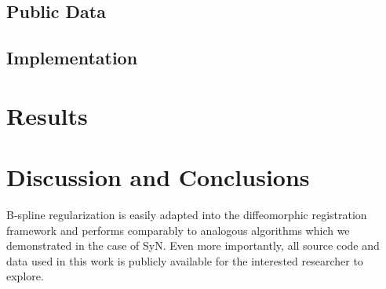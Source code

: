 \documentclass{frontiersSCNS}
\begin{document}
\subsection{Public Data}

\subsection{Implementation}

\section{Results}


\section{Discussion and Conclusions}

B-spline regularization is easily adapted into the diffeomorphic registration framework and performs comparably to analogous algorithms which we demonstrated in the case of SyN.  Even more importantly, all source code and data used in this work is publicly available for the interested researcher to explore.





\end{document}
